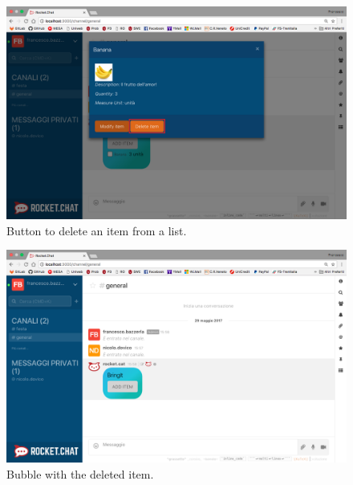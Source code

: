 \begin{figure}[H]
  \centering 
  \includegraphics[width=\textwidth]{Sections/3-HowToUse/Images/popup_item_delete.png}
  \caption{Button to delete an item from a list.}
\end{figure}

\begin{figure}[H]
  \centering 
  \includegraphics[width=\textwidth]{Sections/3-HowToUse/Images/bubble_item_deleted.png}
  \caption{Bubble with the deleted item.}
\end{figure}